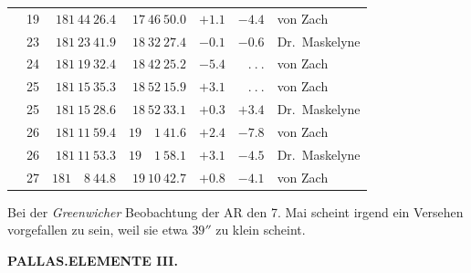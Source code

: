\begin{center}
{\begin{tabular}{r r|r|r|r|r|l}
&19&$181\ 44\ 26.4$&$17\ 46\ 50.0$&$+1.1$&$-4.4$&von Zach\\
&23&$181\ 23\ 41.9$&$18\ 32\ 27.4$&$-0.1$&$-0.6$&Dr.\ Maskelyne\\
&24&$181\ 19\ 32.4$&$18\ 42\ 25.2$&$-5.4$&$\ .\ .\ .$&von Zach\\
&25&$181\ 15\ 35.3$&$18\ 52\ 15.9$&$+3.1$&$\ .\ .\ .$&von Zach\\
&25&$181\ 15\ 28.6$&$18\ 52\ 33.1$&$+0.3$&$+3.4$&Dr.\ Maskelyne\\
&26&$181\ 11\ 59.4$&$19\quad1\ 41.6$&$+2.4$&$-7.8$&von Zach\\
&26&$181\ 11\ 53.3$&$19\quad1\ 58.1$&$+3.1$&$-4.5$&Dr.\ Maskelyne\\
&27&$181\quad8\ 44.8$&$19\ 10\ 42.7$&$+0.8$&$-4.1$&von Zach
\end{tabular}}
\end{center}
\expandafter\def\csname HistoricalNoteText20\endcsname{Bei der \textit{Greenwicher} Beobachtung der AR den 7. Mai scheint irgend ein Versehen vorgefallen zu sein, weil sie etwa $39''$ zu klein scheint.}
\clearpage
\thispagestyle{empty}
\noindent{}%
\makebox[12mm][l]{}%
\parbox[t]{\dimexpr\linewidth-24mm\relax}{\centering\footnotesize\bfseries PALLAS.\enspace ELEMENTE III.\par}%
\par\nobreak\medskip

